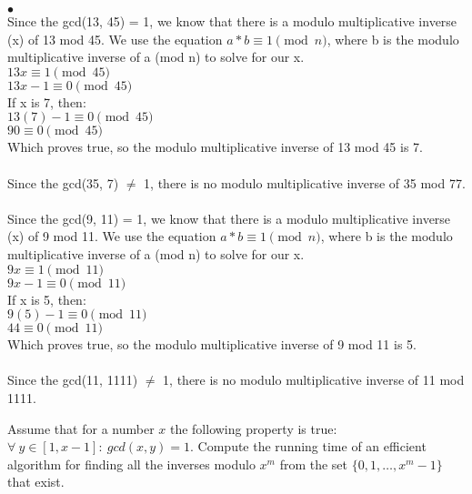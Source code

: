 \documentclass{article}
\newenvironment{myitem}{\begin{list}{$\bullet$}
{\setlength{\itemsep}{-0pt}
\setlength{\topsep}{0pt}
\setlength{\labelwidth}{0pt}
\setlength{\leftmargin}{10pt}
\setlength{\parsep}{-0pt}
\setlength{\itemsep}{0pt}
\setlength{\partopsep}{0pt}}}%
{\end{list}}
\begin{document}
\begin{myitem}
 \\
Since the gcd(13, 45) = 1, we know that there is a modulo multiplicative inverse
(x) of 13 mod 45. We use the equation $a*b \equiv 1 \pmod{n}$, where b is the
modulo multiplicative inverse of a (mod n) to solve for our x.\\
$13x \equiv 1 \pmod{45}$\\
$13x - 1  \equiv 0 \pmod{45}$\\
If x is 7, then:\\
$13(7)-1 \equiv 0 \pmod{45}$\\
$90 \equiv 0 \pmod{45}$\\
Which proves true, so the modulo multiplicative inverse of 13 mod 45 is 7.\\

 \\
Since the gcd(35, 7) $\neq$ 1, there is no modulo multiplicative inverse of 35 mod 77.\\

 \\
Since the gcd(9, 11) = 1, we know that there is a modulo multiplicative inverse
(x) of 9 mod 11. We use the equation $a*b \equiv 1 \pmod{n}$, where b is the
modulo multiplicative inverse of a (mod n) to solve for our x.\\
$9x \equiv 1 \pmod{11}$\\
$9x - 1  \equiv 0 \pmod{11}$\\
If x is 5, then:\\
$9(5)-1 \equiv 0 \pmod{11}$\\
$44 \equiv 0 \pmod{11}$\\
Which proves true, so the modulo multiplicative inverse of 9 mod 11 is 5.\\

\\ 
Since the gcd(11, 1111) $\neq$ 1, there is no modulo multiplicative inverse of 11 mod 1111.\\


\item Assume that for a number $x$ the following property is true:
  $\forall\ y \in [1,x-1]:\ gcd(x,y) = 1$. Compute the running time of
  an efficient algorithm for finding all the inverses modulo $x^m$
  from the set $\{0, 1, \ldots, x^m-1\}$ that exist.\\
\end{myitem}
\end{document}
